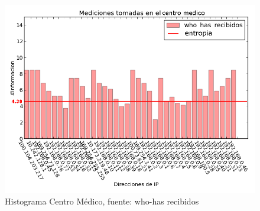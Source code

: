 \begin{figure}[!h]
	\begin{center}
		  \includegraphics[scale=0.4]{Graficos/centromedico_received_who_has.png}
		  \caption{Histograma Centro Médico, fuente: who-has recibidos}
		  \label{fig:contra1}
	\end{center}
\end{figure}

